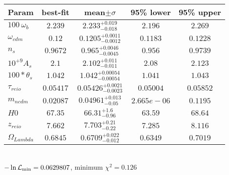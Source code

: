 \begin{tabular}{|l|c|c|c|c|} 
 \hline 
Param & best-fit & mean$\pm\sigma$ & 95\% lower & 95\% upper \\ \hline 
$100~\omega{}_{b }$ &$2.239$ & $2.233_{-0.018}^{+0.019}$ & $2.196$ & $2.269$ \\ 
$\omega{}_{cdm }$ &$0.12$ & $0.1205_{-0.0012}^{+0.0011}$ & $0.1183$ & $0.1228$ \\ 
$n_{s }$ &$0.9672$ & $0.965_{-0.0045}^{+0.0046}$ & $0.956$ & $0.9739$ \\ 
$10^{+9}A_{s }$ &$2.1$ & $2.102_{-0.011}^{+0.011}$ & $2.08$ & $2.123$ \\ 
$100*\theta{}_{s }$ &$1.042$ & $1.042_{-0.00054}^{+0.00054}$ & $1.041$ & $1.043$ \\ 
$\tau{}_{reio }$ &$0.05417$ & $0.05426_{-0.0023}^{+0.0021}$ & $0.05004$ & $0.05852$ \\ 
$m_{ncdm }$ &$0.02087$ & $0.04961_{-0.05}^{+0.013}$ & $2.665e-06$ & $0.1195$ \\ 
$H0$ &$67.35$ & $66.31_{-0.96}^{+1.6}$ & $63.59$ & $68.64$ \\ 
$z_{reio }$ &$7.662$ & $7.703_{-0.22}^{+0.21}$ & $7.285$ & $8.116$ \\ 
$\Omega{}_{Lambda }$ &$0.6845$ & $0.6709_{-0.012}^{+0.022}$ & $0.6349$ & $0.7019$ \\ 
\hline 
 \end{tabular} \\ 
$-\ln{\cal L}_\mathrm{min} =0.0629807$, minimum $\chi^2=0.126$ \\ 
